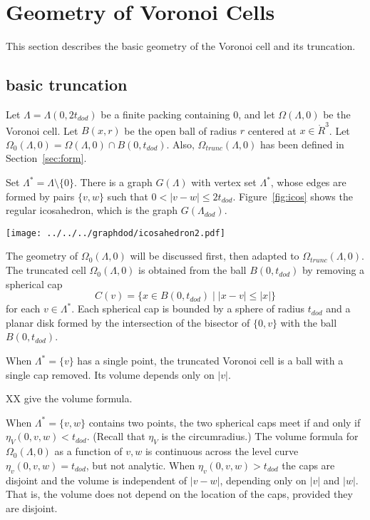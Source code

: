 \section{Geometry of Voronoi Cells}

This section describes the basic geometry of the
 Voronoi cell and
its truncation.  

\subsection{basic truncation}

Let $\Lambda = \Lambda(0,2t_{dod})$ be a finite
packing containing $0$, and let $\Omega(\Lambda,0)$ be the Voronoi cell.
Let $B(x,r)$ be the open ball of
radius $r$ centered at $x\in\ring{R}^3$.
Let $\Omega_0(\Lambda,0) = \Omega(\Lambda,0)\cap B(0,t_{dod})$.
Also, $\Omega_{trunc}(\Lambda,0)$ 
has been defined in Section~\ref{sec:form}.

Set $\Lambda^* = \Lambda\setminus\{0\}$.  There is a graph $G(\Lambda)$
with vertex set $\Lambda^*$, whose edges are formed by pairs
$\{v,w\}$ such that $0<|v-w|\le 2t_{dod}$.  Figure~\ref{fig:icos}
shows the regular icosahedron, which is the graph $G(\Lambda_{dod})$.


\begin{floatingfigure}{30mm}
  \begin{center}
  \texttt{[image: ../../../graphdod/icosahedron2.pdf]}
   \end{center}
  \caption{}
\label{fig:icos}
\end{floatingfigure}

The geometry of $\Omega_0(\Lambda,0)$ will be discussed first,
then adapted to $\Omega_{trunc}(\Lambda,0)$.  The truncated cell
$\Omega_0(\Lambda,0)$ is obtained from the ball $B(0,t_{dod})$ by
removing a spherical cap
   $$
   C(v) = \{x \in B(0,t_{dod}) \mid  |x - v| \le |x| \}
   $$
for each $v\in\Lambda^*$.
Each spherical cap is bounded by a sphere of radius $t_{dod}$ and
a planar disk formed by the intersection of the bisector of 
$\{0,v\}$ with the ball $B(0,t_{dod})$.

When $\Lambda^* = \{v\}$ has a single point, the truncated Voronoi
cell is a ball with a single cap removed.  Its volume depends
only on $|v|$.   

XX give the volume formula.

When $\Lambda^*=\{v,w\}$ contains two points, the two spherical
caps meet if and only if $\eta_V(0,v,w) < t_{dod}$.  (Recall that
$\eta_V$ is the circumradius.)   The volume formula for
$\Omega_0(\Lambda,0)$ as a function of $v,w$ is continuous
across the level curve $\eta_v(0,v,w)=t_{dod}$, but not analytic.
When $\eta_v(0,v,w) > t_{dod}$ the caps are disjoint and the
volume is independent of $|v-w|$, depending only on $|v|$ and $|w|$.
That is, the volume does not depend on the location of the caps,
provided they are disjoint.

